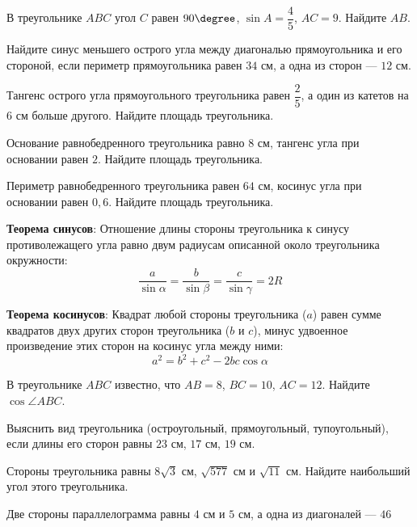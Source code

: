 \begin{class}[number=2]
	\begin{listofex}
		\item В треугольнике \( ABC \) угол \( C \) равен \( 90\degree \), \( \sin A=\dfrac{4}{5} \), \( AC=9 \). Найдите \( AB \).
		\item Найдите синус меньшего острого угла между	диагональю прямоугольника и его стороной, если периметр прямоугольника равен \( 34 \) см, а одна из сторон --- \( 12 \) см. 
		\item Тангенс острого угла прямоугольного треугольника равен \( \dfrac{2}{5} \), а один из катетов на \( 6 \) см больше другого. Найдите площадь треугольника. 
		\item Основание равнобедренного треугольника равно \( 8 \) см, тангенс угла при основании равен \( 2 \). Найдите площадь треугольника. 
		\item Периметр равнобедренного треугольника равен \( 64 \) см, косинус угла при основании равен \( 0,6 \). Найдите площадь треугольника.
	\end{listofex}
		\begin{definit}
			\textbf{Теорема синусов}: Отношение длины стороны треугольника к синусу противолежащего угла равно двум радиусам описанной около треугольника окружности: \[\dfrac{a}{\sin\alpha}=\dfrac{b}{\sin\beta}=\dfrac{c}{\sin\gamma}=2R\]
		\end{definit}
		\begin{definit}
			\textbf{Теорема косинусов}: Квадрат любой стороны треугольника (\( a \)) равен сумме квадратов двух других сторон треугольника (\( b \) и \( c \)), минус удвоенное произведение этих сторон на косинус угла между ними: \[a^2=b^2+c^2-2bc\cos\alpha\]
		\end{definit}
	\begin{listofex}[resume]
		\item В треугольнике \( ABC \) известно, что \( AB=8 \), \( BC=10 \), \( AC=12 \). Найдите \( \cos\angle ABC \).
		\item Выяснить вид треугольника (остроугольный, прямоугольный, тупоугольный), если длины его сторон равны \( 23 \) см, \( 17 \) см, \( 19 \) см. 
		\item Стороны треугольника равны \( 8\sqrt{3} \) см, \( \sqrt{577} \) см и \( \sqrt{11} \) см. Найдите наибольший угол	этого треугольника. 
		\item Две стороны параллелограмма равны \( 4 \) см и \( 5 \) см, а одна из диагоналей --- \( 46 \)

\end{listofex}
\end{class}
